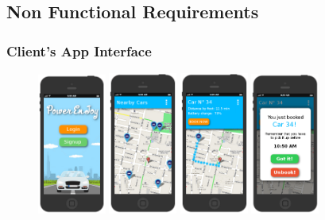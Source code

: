 \documentclass[11pt]{article} %
\begin{document}
\subsection{Non Functional Requirements}

\subsubsection{Client's App Interface}

\begin{figure}[H]
	\includegraphics[width=0.2\textwidth]{mockup/1Login.png}
	\includegraphics[width=0.2\textwidth]{mockup/2MainClient.png}
	\includegraphics[width=0.2\textwidth]{mockup/3CarSelected.png}
	\includegraphics[width=0.2\textwidth]{mockup/4CarBooked.png}

\end{figure}
\end{document}
